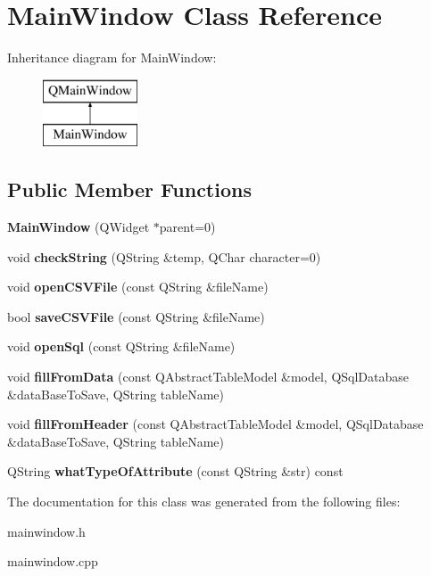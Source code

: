 \hypertarget{class_main_window}{}\section{Main\+Window Class Reference}
\label{class_main_window}
Inheritance diagram for Main\+Window\+:\begin{figure}[H]
\begin{center}
\leavevmode
\includegraphics[height=2.000000cm]{class_main_window}
\end{center}
\end{figure}
\subsection*{Public Member Functions}
\begin{DoxyCompactItemize}
\item 
\mbox{\label{class_main_window_a8b244be8b7b7db1b08de2a2acb9409db}} 
{\bfseries Main\+Window} (Q\+Widget $\ast$parent=0)
\item 
\mbox{\label{class_main_window_a45f35b5048fc97debcc8bd1cbd6f31cb}} 
void {\bfseries check\+String} (Q\+String \&temp, Q\+Char character=0)
\item 
\mbox{\label{class_main_window_a6bb6d76a07479f691ad0a416e71f2918}} 
void {\bfseries open\+C\+S\+V\+File} (const Q\+String \&file\+Name)
\item 
\mbox{\label{class_main_window_a2b4b4a9321cf02d591d5217976a47664}} 
bool {\bfseries save\+C\+S\+V\+File} (const Q\+String \&file\+Name)
\item 
\mbox{\label{class_main_window_af61e44314f27379c620dd2e964fe3cb8}} 
void {\bfseries open\+Sql} (const Q\+String \&file\+Name)
\item 
\mbox{\label{class_main_window_ac27d646901950cb54a4116a69a042c6b}} 
void {\bfseries fill\+From\+Data} (const Q\+Abstract\+Table\+Model \&model, Q\+Sql\+Database \&data\+Base\+To\+Save, Q\+String table\+Name)
\item 
\mbox{\label{class_main_window_a020d537dfc654cc707e94d290b30a611}} 
void {\bfseries fill\+From\+Header} (const Q\+Abstract\+Table\+Model \&model, Q\+Sql\+Database \&data\+Base\+To\+Save, Q\+String table\+Name)
\item 
\mbox{\label{class_main_window_a3c7c547487114c77ccfe82140a045ece}} 
Q\+String {\bfseries what\+Type\+Of\+Attribute} (const Q\+String \&str) const
\end{DoxyCompactItemize}


The documentation for this class was generated from the following files\+:\begin{DoxyCompactItemize}
\item 
mainwindow.\+h\item 
mainwindow.\+cpp\end{DoxyCompactItemize}
